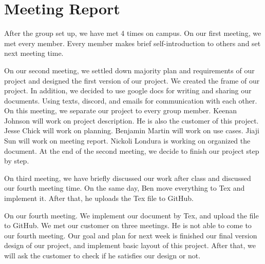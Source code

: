 \documentclass[12pt]{article}
\begin{document}
\section{Meeting Report}
\par
After the group set up, we have met 4 times on campus.  On our first meeting, we met every member. Every member makes brief self-introduction to others and set next meeting time. \\

\par
On our second meeting, we settled down majority plan and requirements of our project and designed the first version of our project. We created the frame of our project. In addition, we decided to use google docs for writing and sharing our documents. Using texts, discord, and emails for communication with each other. On this meeting, we separate our project to every group member. Keenan Johnson will work on project description. He is also the customer of this project. Jesse Chick will work on planning. Benjamin Martin will work on use cases. Jiaji Sun will work on meeting report. Nickoli Londura is working on organized the document. At the end of the second meeting, we decide to finish our project step by step. \\

\par
On third meeting, we have briefly discussed our work after class and discussed our fourth meeting time. On the same day, Ben move everything to Tex and implement it. After that, he uploads the Tex file to GitHub. \\

\par
On our fourth meeting. We implement our document by Tex, and upload the file to GitHub. We met our customer on three meetings. He is not able to come to our fourth meeting. Our goal and plan for next week is finished our final version design of our project, and implement basic layout of this project. After that, we will ask the customer to check if he satisfies our design or not. \\

\cite{rubtut}



\end{document}
